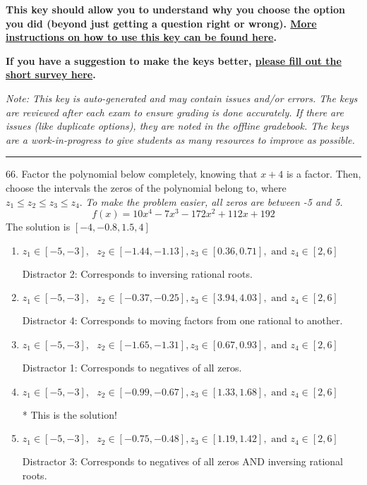 \documentclass{extbook}[14pt]
\begin{document}
\textbf{This key should allow you to understand why you choose the option you did (beyond just getting a question right or wrong). \href{https://xronos.clas.ufl.edu/mac1105spring2020/courseDescriptionAndMisc/Exams/LearningFromResults}{More instructions on how to use this key can be found here}.}

\textbf{If you have a suggestion to make the keys better, \href{https://forms.gle/CZkbZmPbC9XALEE88}{please fill out the short survey here}.}

\textit{Note: This key is auto-generated and may contain issues and/or errors. The keys are reviewed after each exam to ensure grading is done accurately. If there are issues (like duplicate options), they are noted in the offline gradebook. The keys are a work-in-progress to give students as many resources to improve as possible.}

\rule{\textwidth}{0.4pt}

66. Factor the polynomial below completely, knowing that $x+4$ is a factor. Then, choose the intervals the zeros of the polynomial belong to, where $z_1 \leq z_2 \leq z_3 \leq z_4$. \textit{To make the problem easier, all zeros are between -5 and 5.}
\[ f(x) = 10x^{4} -7 x^{3} -172 x^{2} +112 x + 192 \] 
The solution is $ [-4, -0.8, 1.5, 4] $ 

\begin{enumerate}[label=\Alph*.] 
\item $ z_1 \in [-5, -3], \text{   }  z_2 \in [-1.44, -1.13], z_3 \in [0.36, 0.71], \text{   and   } z_4 \in [2, 6] $ 

  Distractor 2: Corresponds to inversing rational roots. 
\item $ z_1 \in [-5, -3], \text{   }  z_2 \in [-0.37, -0.25], z_3 \in [3.94, 4.03], \text{   and   } z_4 \in [2, 6] $ 

  Distractor 4: Corresponds to moving factors from one rational to another. 
\item $ z_1 \in [-5, -3], \text{   }  z_2 \in [-1.65, -1.31], z_3 \in [0.67, 0.93], \text{   and   } z_4 \in [2, 6] $ 

  Distractor 1: Corresponds to negatives of all zeros. 
\item $ z_1 \in [-5, -3], \text{   }  z_2 \in [-0.99, -0.67], z_3 \in [1.33, 1.68], \text{   and   } z_4 \in [2, 6] $ 

 * This is the solution! 
\item $ z_1 \in [-5, -3], \text{   }  z_2 \in [-0.75, -0.48], z_3 \in [1.19, 1.42], \text{   and   } z_4 \in [2, 6] $ 

  Distractor 3: Corresponds to negatives of all zeros AND inversing rational roots. 
\end{enumerate} 
 
\end{document}
